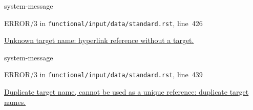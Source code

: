 \documentclass[a4paper]{article}
\begin{document}
\begin{DUclass}{system-message}
\begin{DUadmonition}

ERROR/3 in \texttt{functional/input/data/standard.rst}, line~426

\hyperlink{problematic-2}{
Unknown target name: \textquotedbl{}hyperlink reference without a target\textquotedbl{}.
}
\end{DUadmonition}
\end{DUclass}

\begin{DUclass}{system-message}
\begin{DUadmonition}

ERROR/3 in \texttt{functional/input/data/standard.rst}, line~439

\hyperlink{problematic-3}{
Duplicate target name, cannot be used as a unique reference: \textquotedbl{}duplicate target names\textquotedbl{}.
}
\end{DUadmonition}
\end{DUclass}
\end{document}
